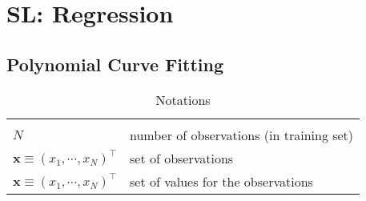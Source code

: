\chapter{SL: Regression}

\section{Polynomial Curve Fitting}

\begin{customArrayStretch}{1.5}
\begin{longtable}{l p{10cm}}

\hline\endfirsthead
\hline\endhead
\hline\endfoot
\hline
\caption*{Notations} \\
\endlastfoot

$N$ & number of observations (in training set) \\ \hline

$\bm{x} \equiv (x_1, \cdots , x_N)^\top$ & set of observations \\ \hline

$\bm{x} \equiv (x_1, \cdots , x_N)^\top$ & set of values for the observations \\ \hline



\end{longtable}
\end{customArrayStretch}
















